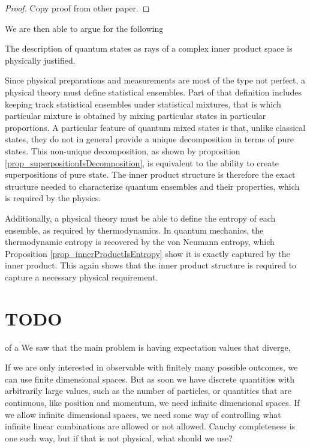 \documentclass[10pt,twocolumn, nofootinbib]{revtex4-2}
\begin{document}
\begin{proof}
	Copy proof from other paper.
\end{proof}

We are then able to argue for the following
\begin{prop}
	The description of quantum states as rays of a complex inner product space is physically justified.
\end{prop}
\begin{justification}
	Since physical preparations and measurements are most of the type not perfect, a physical theory must define statistical ensembles. Part of that definition includes keeping track statistical ensembles under statistical mixtures, that is which particular mixture is obtained by mixing particular states in particular proportions. A particular feature of quantum mixed states is that, unlike classical states, they do not in general provide a unique decomposition in terms of pure states. This non-unique decomposition, as shown by proposition \ref{prop_superpositionIsDecomposition}, is equivalent to the ability to create superpositions of pure state. The inner product structure is therefore the exact structure needed to characterize quantum ensembles and their properties, which is required by the physics.
	
	Additionally, a physical theory must be able to define the entropy of each ensemble, as required by thermodynamics. In quantum mechanics, the thermodynamic entropy is recovered by the von Neumann entropy, which Proposition \ref{prop_innerProductIsEntropy} show it is exactly captured by the inner product. This again shows that the inner product structure is required to capture a necessary physical requirement.
\end{justification}

\section{TODO}

of a We saw that the main problem is having expectation values that diverge,

If we are only interested in observable with finitely many possible outcomes, we can use finite dimensional spaces. But as soon we have discrete quantities with arbitrarily large values, such as the number of particles, or quantities that are continuous, like position and momentum, we need infinite dimensional spaces. If we allow infinite dimensional spaces, we need some way of controlling what infinite linear combinations are allowed or not allowed. Cauchy completeness is one such way, but if that is not physical, what should we use?
\end{document}
